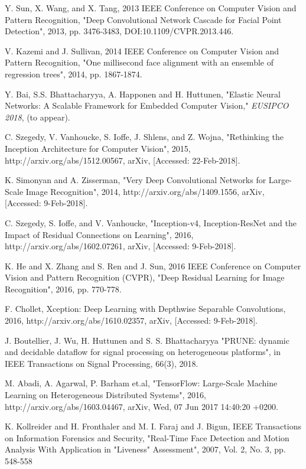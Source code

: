 \documentclass[conference]{IEEEtran}
\begin{document}
\begin{thebibliography}{00}
 Y. Sun, X. Wang, and X. Tang, 2013 IEEE Conference on Computer Vision and Pattern Recognition, "Deep Convolutional Network Cascade for Facial Point Detection", 2013, pp. 3476-3483, DOI:10.1109/CVPR.2013.446.


V. Kazemi and J. Sullivan, 2014 IEEE Conference on Computer Vision and Pattern Recognition, "One millisecond face alignment with an ensemble of regression trees", 2014, pp. 1867-1874.

 Y. Bai, S.S. Bhattacharyya, A. Happonen and H. Huttunen, "Elastic Neural Networks: A Scalable Framework for Embedded Computer Vision," \textit{EUSIPCO 2018}, (to appear).


C. Szegedy, V. Vanhoucke, S. Ioffe, J. Shlens, and Z. Wojna, "Rethinking the Inception Architecture for Computer Vision", 2015, http://arxiv.org/abs/1512.00567, arXiv, [Accessed: 22-Feb-2018].

K. Simonyan and A. Zisserman, "Very Deep Convolutional Networks for Large-Scale Image Recognition", 2014, http://arxiv.org/abs/1409.1556, arXiv, [Accessed: 9-Feb-2018].

C. Szegedy, S. Ioffe, and V. Vanhoucke, "Inception-v4, Inception-ResNet and the Impact of Residual Connections on Learning", 2016, http://arxiv.org/abs/1602.07261, arXiv, [Accessed: 9-Feb-2018].

K. He and X. Zhang and S. Ren and J. Sun, 2016 IEEE Conference on Computer Vision and Pattern Recognition (CVPR), "Deep Residual Learning for Image Recognition", 2016, pp. 770-778.

F. Chollet, Xception: Deep Learning with Depthwise Separable Convolutions, 2016, http://arxiv.org/abs/1610.02357, arXiv, [Accessed: 9-Feb-2018].

 J. Boutellier, J. Wu, H. Huttunen and S. S. Bhattacharyya "PRUNE: dynamic and decidable dataflow for signal processing on heterogeneous platforms", in IEEE Transactions on Signal Processing, 66(3), 2018.


\iffalse

M. Abadi, A. Agarwal, P. Barham et.al, "TensorFlow: Large-Scale Machine Learning on Heterogeneous Distributed Systems", 2016, http://arxiv.org/abs/1603.04467, arXiv, Wed, 07 Jun 2017 14:40:20 +0200.

K. Kollreider and H. Fronthaler and M. I. Faraj and J. Bigun, IEEE Transactions on Information Forensics and Security, "Real-Time Face Detection and Motion Analysis With Application in "Liveness" Assessment", 2007, Vol. 2, No. 3, pp. 548-558


\end{thebibliography}
\end{document}
